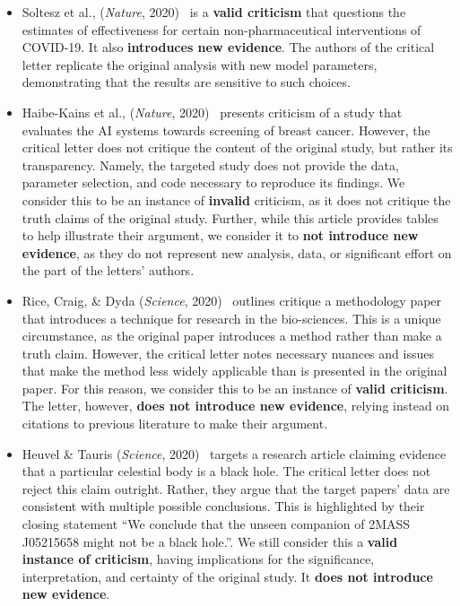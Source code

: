 \documentclass[12pt]{article} %
\begin{document}
\begin{itemize}
    \item Soltesz et al., (\textit{Nature}, 2020)~\cite{soltesz_2020_interventions} is a \textbf{valid criticism} that questions the estimates of effectiveness for certain non-pharmaceutical interventions of COVID-19. 
    It also \textbf{introduces new evidence}.
    The authors of the critical letter replicate the original analysis with new model parameters, demonstrating that the results are sensitive to such choices.

    \item Haibe-Kains et al., (\textit{Nature}, 2020)~\cite{HaibeKains_2020_transparency} presents criticism of a study that evaluates the AI systems towards screening of breast cancer. 
    However, the critical letter does not critique the content of the original study, but rather its transparency. 
    Namely, the targeted study does not provide the data, parameter selection, and code necessary to reproduce its findings.
    We consider this to be an instance of \textbf{invalid} criticism, as it does not critique the truth claims of the original study. 
    Further, while this article provides tables to help illustrate their argument, we consider it to \textbf{not introduce new evidence}, as they do not represent new analysis, data, or significant effort on the part of the letters' authors.
    
    \item Rice, Craig, \& Dyda (\textit{Science}, 2020)~\cite{rice_2020_rna} outlines critique a methodology paper that introduces a technique for research in the bio-sciences. 
    This is a unique circumstance, as the original paper introduces a method rather than make a truth claim. 
    However, the critical letter notes necessary nuances and issues that make the method less widely applicable than is presented in the original paper.
    For this reason, we consider this to be an instance of \textbf{valid criticism}.
    The letter, however, \textbf{does not introduce new evidence}, relying instead on citations to previous literature to make their argument.

    \item Heuvel \& Tauris (\textit{Science}, 2020)~\cite{vandenHeuvel_2020_black-hole} targets a research article claiming evidence that a particular celestial body is a black hole. 
    The critical letter does not reject this claim outright. 
    Rather, they argue that the target papers' data are consistent with multiple possible conclusions.
    This is highlighted by their closing statement ``We conclude that the unseen companion of 2MASS J05215658 might not be a black hole.''. 
    We still consider this a \textbf{valid instance of criticism}, having implications for the significance, interpretation, and certainty of the original study.
    It \textbf{does not introduce new evidence}.


\end{itemize}
\end{document}
